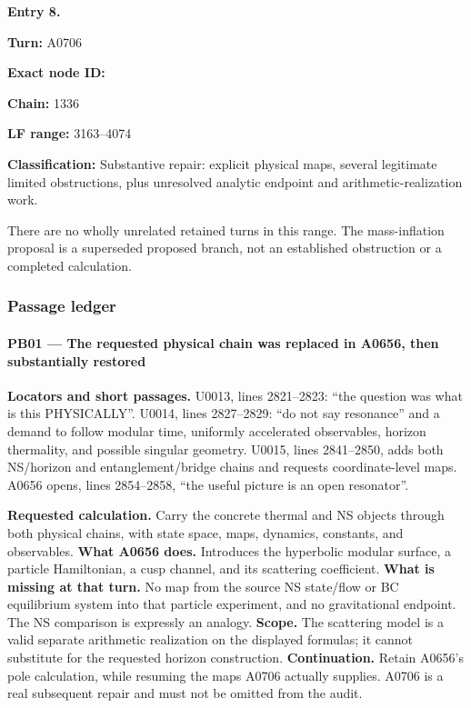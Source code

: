 \textbf{Entry 8.}

\textbf{Turn:} A0706

\textbf{Exact node ID:}
\protect{}

\textbf{Chain:} 1336

\textbf{LF range:} 3163--4074

\textbf{Classification:} Substantive repair: explicit physical maps,
several legitimate limited obstructions, plus unresolved analytic
endpoint and arithmetic-realization work.

There are no wholly unrelated retained turns in this range. The
mass-inflation proposal is a superseded proposed branch, not an
established obstruction or a completed calculation.

\subsubsection{Passage ledger}\label{TranscriptLedgerStage:passage-ledger-1}

\paragraph{PB01 --- The requested physical chain was replaced in A0656,
then substantially
restored}\label{TranscriptLedgerStage:pb01-the-requested-physical-chain-was-replaced-in-a0656-then-substantially-restored}

\textbf{Locators and short passages.} U0013, lines 2821--2823: ``the
question was what is this PHYSICALLY''. U0014, lines 2827--2829: ``do
not say resonance'' and a demand to follow modular time, uniformly
accelerated observables, horizon thermality, and possible singular
geometry. U0015, lines 2841--2850, adds both NS/horizon and
entanglement/bridge chains and requests coordinate-level maps. A0656
opens, lines 2854--2858, ``the useful picture is an open resonator''.

\textbf{Requested calculation.} Carry the concrete thermal and NS
objects through both physical chains, with state space, maps, dynamics,
constants, and observables. \textbf{What A0656 does.} Introduces the
hyperbolic modular surface, a particle Hamiltonian, a cusp channel, and
its scattering coefficient. \textbf{What is missing at that turn.} No
map from the source NS state/flow or BC equilibrium system into that
particle experiment, and no gravitational endpoint. The NS comparison is
expressly an analogy. \textbf{Scope.} The scattering model is a valid
separate arithmetic realization on the displayed formulas; it cannot
substitute for the requested horizon construction.
\textbf{Continuation.} Retain A0656's pole calculation, while resuming
the maps A0706 actually supplies. A0706 is a real subsequent repair and
must not be omitted from the audit.

